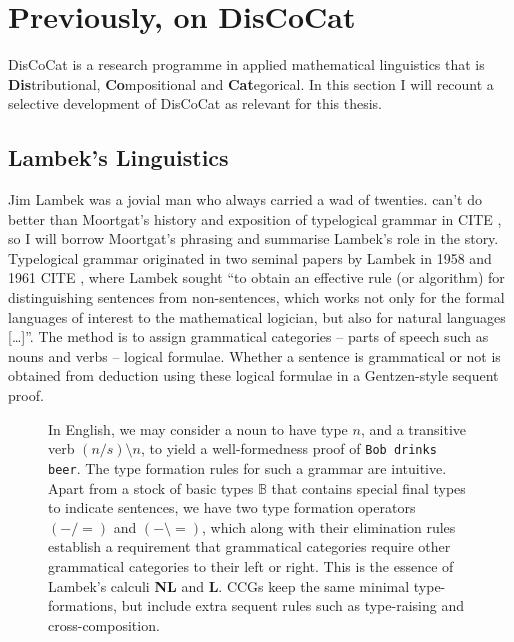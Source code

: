 \section{Previously, on DisCoCat}\label{sec:previously}

DisCoCat is a research programme in applied mathematical linguistics that is \textbf{Dis}tributional, \textbf{Co}mpositional and \textbf{Cat}egorical. In this section I will recount a selective development of DisCoCat as relevant for this thesis.

\subsection{Lambek's Linguistics}

Jim Lambek was a jovial man who always carried a wad of twenties.  can't do better than Moortgat's history and exposition of typelogical grammar in \bR CITE \e, so I will borrow Moortgat's phrasing and summarise Lambek's role in the story. Typelogical grammar originated in two seminal papers by Lambek in 1958 and 1961 \bR CITE \e, where Lambek sought “to obtain an effective rule (or algorithm) for distinguishing sentences from non-sentences, which works not only for the formal languages of interest to the mathematical logician, but also for natural languages […]”. The method is to assign grammatical categories -- parts of speech such as nouns and verbs -- logical formulae. Whether a sentence is grammatical or not is obtained from deduction using these logical formulae in a Gentzen-style sequent proof.

\begin{figure}[h!]
\centering
{}
\caption{In English, we may consider a noun to have type $n$, and a transitive verb $(n/s)\setminus n$, to yield a well-formedness proof of \texttt{Bob drinks beer}. The type formation rules for such a grammar are intuitive. Apart from a stock of basic types $\mathbb{B}$ that contains special final types to indicate sentences, we have two type formation operators $(-/=)$ and $(- \setminus =)$, which along with their elimination rules establish a requirement that grammatical categories require other grammatical categories to their left or right. This is the essence of Lambek's calculi \textbf{NL} and \textbf{L}. CCGs keep the same minimal type-formations, but include extra sequent rules such as type-raising and cross-composition.}
\end{figure}

